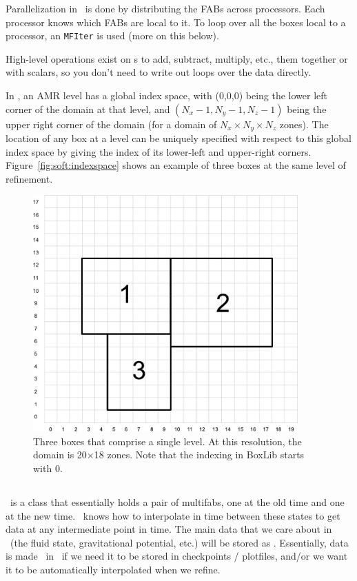 Parallelization in \boxlib\ is done by distributing the FABs across
processors.  Each processor knows which FABs are local to it.  To loop
over all the boxes local to a processor, an {\tt MFIter} is used (more
on this below).

High-level operations exist on \multifab s to add, subtract, multiply,
etc., them together or with scalars, so you don't need to write out
loops over the data directly.

In \boxlib, an AMR level has a global index space, with (0,0,0) being
the lower left corner of the domain at that level, and $(N_x-1, N_y-1,
N_z-1)$ being the upper right corner of the domain (for a domain of
$N_x \times N_y \times N_z$ zones).  The location of any box at a
level can be uniquely specified with respect to this global index
space by giving the index of its lower-left and upper-right corners.
Figure~\ref{fig:soft:indexspace} shows an example of three boxes at
the same level of refinement.

\begin{figure}[t]
\centering
\includegraphics[width=4.0in]{index_grid2}
\caption[Single-level grid structure]
{\label{fig:boxes} Three boxes that comprise a single level.  At this
  resolution, the domain is 20$\times$18 zones.  Note that the
  indexing in BoxLib starts with $0$.}
\end{figure}




\subsection{\statedata}

\statedata\ is a class that essentially holds a pair of multifabs, one
at the old time and one at the new time.  \boxlib\ knows how to
interpolate in time between these states to get data at any
intermediate point in time.  The main data that we care about in
\castro\ (the fluid state, gravitational potential, etc.) will be
stored as \statedata.  Essentially, data is made \statedata\ in
\castro\ if we need it to be stored in checkpoints / plotfiles, and/or
we want it to be automatically interpolated when we refine.

